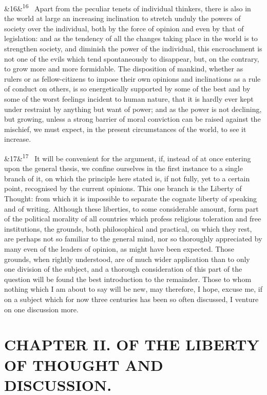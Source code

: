 \documentclass[12pt]{article}
\newcommand{\para}[1][]{\par\noindent\ifx&#1&\else\textsuperscript{\footnotesize #1}~\fi}
\begin{document}
\para[16] Apart from the peculiar tenets of individual thinkers, there is also in the world at large an increasing inclination to stretch unduly the powers of society over the individual, both by the force of opinion and even by that of legislation: and as the tendency of all the changes taking place in the world is to strengthen society, and diminish the power of the individual, this encroachment is not one of the evils which tend spontaneously to disappear, but, on the contrary, to grow more and more formidable. The disposition of mankind, whether as rulers or as fellow-citizens to impose their own opinions and inclinations as a rule of conduct on others, is so energetically supported by some of the best and by some of the worst feelings incident to human nature, that it is hardly ever kept under restraint by anything but want of power; and as the power is not declining, but growing, unless a strong barrier of moral conviction can be raised against the mischief, we must expect, in the present circumstances of the world, to see it increase.

\para[17] It will be convenient for the argument, if, instead of at once entering upon the general thesis, we confine ourselves in the first instance to a single branch of it, on which the principle here stated is, if not fully, yet to a certain point, recognised by the current opinions. This one branch is the Liberty of Thought: from which it is impossible to separate the cognate liberty of speaking and of writing. Although these liberties, to some considerable amount, form part of the political morality of all countries which profess religious toleration and free institutions, the grounds, both philosophical and practical, on which they rest, are perhaps not so familiar to the general mind, nor so thoroughly appreciated by many even of the leaders of opinion, as might have been expected. Those grounds, when rightly understood, are of much wider application than to only one division of the subject, and a thorough consideration of this part of the question will be found the best introduction to the remainder. Those to whom nothing which I am about to say will be new, may therefore, I hope, excuse me, if on a subject which for now three centuries has been so often discussed, I venture on one discussion more.

\section*{CHAPTER II. OF THE LIBERTY OF THOUGHT AND DISCUSSION.}
\end{document}
